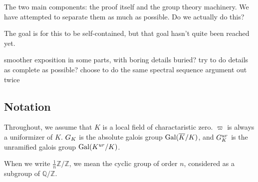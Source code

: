 The two main components: the proof itself and the group theory
machinery.
We have attempted to separate them as much as possible.
Do we actually do this?

The goal is for this to be self-contained, but 
that goal hasn't quite been reached yet.

smoother exposition in some parts, with boring details buried?
try to do details as complete as possible?
choose to do the same spectral sequence argument out twice


%
%
%

\subsection{Notation}

Throughout, we assume that \(K\) is a local field
of charactaristic zero. 
\(\varpi\) is always a uniformizer of \(K\).
\(G_{K}\) is the absolute galois group \(\operatorname{Gal}(\overline{K} / K)\),
and \(G_{K}^{ur}\) is the unramified galois group
\(\operatorname{Gal}(K^{ur} / K)\).

When we write \(\frac{1}{n}\mathbb{Z} / \mathbb{Z}\), we mean
the cyclic group of order \(n\), considered as a subgroup of
\(\mathbb{Q} / \mathbb{Z}\).

